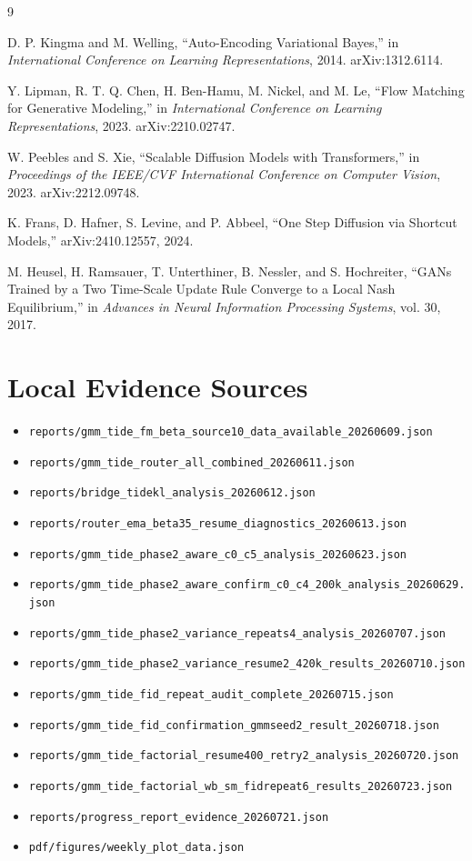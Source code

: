 \documentclass[11pt,a4paper]{article}
\newcommand{\run}[1]{{\small\nolinkurl{#1}}}
\begin{document}
\begin{thebibliography}{9}

D. P. Kingma and M. Welling,
``Auto-Encoding Variational Bayes,'' in \emph{International Conference on
Learning Representations}, 2014. arXiv:1312.6114.

Y. Lipman, R. T. Q. Chen, H. Ben-Hamu, M. Nickel, and M. Le,
``Flow Matching for Generative Modeling,'' in \emph{International Conference
on Learning Representations}, 2023. arXiv:2210.02747.

W. Peebles and S. Xie,
``Scalable Diffusion Models with Transformers,'' in \emph{Proceedings of the
IEEE/CVF International Conference on Computer Vision}, 2023.
arXiv:2212.09748.

K. Frans, D. Hafner, S. Levine, and P. Abbeel,
``One Step Diffusion via Shortcut Models,'' arXiv:2410.12557, 2024.

M. Heusel, H. Ramsauer, T. Unterthiner, B. Nessler, and S. Hochreiter,
``GANs Trained by a Two Time-Scale Update Rule Converge to a Local Nash
Equilibrium,'' in \emph{Advances in Neural Information Processing Systems},
vol. 30, 2017.

\end{thebibliography}

\appendix
\section{Local Evidence Sources}

\small
\begin{itemize}
  \item \run{reports/gmm_tide_fm_beta_source10_data_available_20260609.json}
  \item \run{reports/gmm_tide_router_all_combined_20260611.json}
  \item \run{reports/bridge_tidekl_analysis_20260612.json}
  \item \run{reports/router_ema_beta35_resume_diagnostics_20260613.json}
  \item \run{reports/gmm_tide_phase2_aware_c0_c5_analysis_20260623.json}
  \item \run{reports/gmm_tide_phase2_aware_confirm_c0_c4_200k_analysis_20260629.json}
  \item \run{reports/gmm_tide_phase2_variance_repeats4_analysis_20260707.json}
  \item \run{reports/gmm_tide_phase2_variance_resume2_420k_results_20260710.json}
  \item \run{reports/gmm_tide_fid_repeat_audit_complete_20260715.json}
  \item \run{reports/gmm_tide_fid_confirmation_gmmseed2_result_20260718.json}
  \item \run{reports/gmm_tide_factorial_resume400_retry2_analysis_20260720.json}
  \item \run{reports/gmm_tide_factorial_wb_sm_fidrepeat6_results_20260723.json}
  \item \run{reports/progress_report_evidence_20260721.json}
  \item \run{pdf/figures/weekly_plot_data.json}
\end{itemize}
\normalsize
\end{document}

